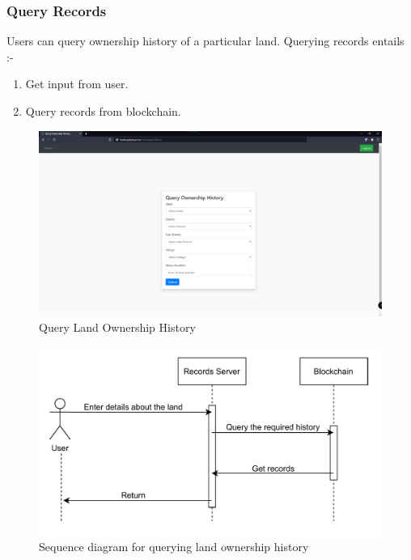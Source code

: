 \documentclass{article}
\begin{document}
        \subsubsection{Query Records}
            Users can query ownership history of a particular land.
            Querying records entails :-
            \begin{enumerate}
                \item Get input from user.
                \item Query records from blockchain.
            \end{enumerate}
            
            \begin{figure}[htbp]
                \includegraphics[scale=0.25]{records_query_history}
                \centering
                \caption{Query Land Ownership History}
            \end{figure}
            
            \begin{figure}[htbp]
                \includegraphics[scale=0.25]{records_seq_query_history}
                \centering
                \caption{Sequence diagram for querying land ownership history}
            \end{figure}
\end{document}
